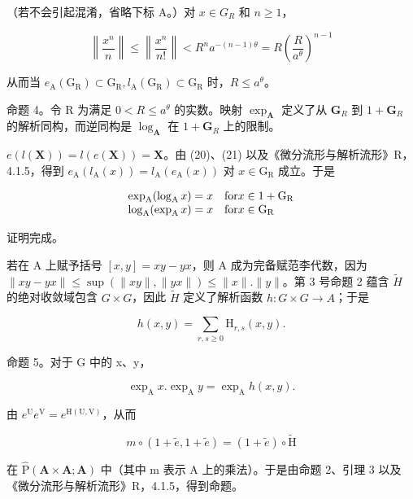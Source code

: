 （若不会引起混淆，省略下标 A。）对 \(x \in G_R\) 和 \(n \geqslant 1\)，

\[
\left\| \frac {x ^ {n}}{n} \right\| \leqslant \left\| \frac {x ^ {n}}{n !} \right\| <   R ^ {n} a ^ {- (n - 1) \theta} = R \left(\frac {R}{a ^ {\theta}}\right) ^ {n - 1}\tag{24}
\]

从而当 \(e_{\mathrm{A}}(\mathrm{G}_{\mathrm{R}}) \subset \mathrm{G}_{\mathrm{R}}, l_{\mathrm{A}}(\mathrm{G}_{\mathrm{R}}) \subset \mathrm{G}_{\mathrm{R}}\) 时，\(R \leqslant a^{\theta}\)。

命题 4。令 R 为满足 \(0 < R \leqslant a^{\theta}\) 的实数。映射 \(\exp_{\mathbf{A}}\) 定义了从 \(\mathbf{G}_{R}\) 到 \(1 + \mathbf{G}_{R}\) 的解析同构，而逆同构是 \(\log_{\mathbf{A}}\) 在 \(1 + \mathbf{G}_{R}\) 上的限制。

\(e(l(\mathbf{X})) = l(e(\mathbf{X})) = \mathbf{X}\)。由 (20)、(21) 以及《微分流形与解析流形》R，4.1.5，得到 \(e_{\mathrm{A}}(l_{\mathrm{A}}(x)) = l_{\mathrm{A}}(e_{\mathrm{A}}(x))\) 对 \(x \in \mathrm{G}_{\mathrm{R}}\) 成立。于是

\[
\begin{array}{l l} \exp_ {\mathrm{A}} (\log_ {\mathrm{A}} x) = x & \text {for} x \in 1 + \mathrm{G} _ {\mathrm{R}} \\ \log_ {\mathrm{A}} (\exp_ {\mathrm{A}} x) = x & \text {for} x \in \mathrm{G} _ {\mathrm{R}} \end{array}
\]

证明完成。

若在 A 上赋予括号 \([x,y]=xy-yx\)，则 A 成为完备赋范李代数，因为 \(\|xy-yx\|\leqslant\sup(\|xy\|,\|yx\|)\leqslant\|x\|. \|y\|\)。第 3 号命题 2 蕴含 \(\tilde{H}\) 的绝对收敛域包含 \(G\times G\)，因此 \(\tilde{H}\) 定义了解析函数 \(h:G\times G\to A\)；于是

\[
h (x, y) = \sum_ {r, s \geqslant 0} \mathrm{H} _ {r, s} (x, y).\tag{25}
\]

命题 5。对于 G 中的 x、y，

\[
\exp_ {\mathrm{A}} x. \exp_ {\mathrm{A}} y = \exp_ {\mathrm{A}} h (x, y).\tag{26}
\]

由 \(e^{\mathrm{U}}e^{\mathrm{V}} = e^{\mathrm{H(U,V)}}\)，从而

\[
m \circ (1 + \tilde {e}, 1 + \tilde {e}) = (1 + \tilde {e}) \circ \tilde {\mathrm{H}}
\]

在 \(\hat{\mathrm{P}}(\mathbf{A} \times \mathbf{A}; \mathbf{A})\) 中（其中 m 表示 A 上的乘法）。于是由命题 2、引理 3 以及《微分流形与解析流形》R，4.1.5，得到命题。


